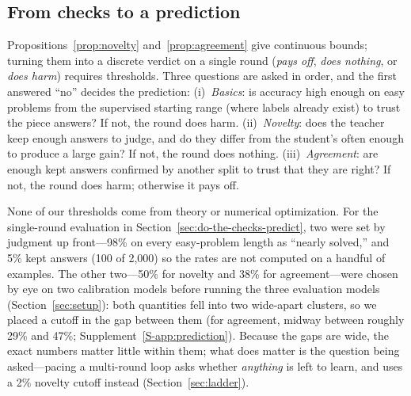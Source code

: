 \subsection{From checks to a prediction}
\label{sec:rule}

Propositions~\ref{prop:novelty} and~\ref{prop:agreement} give continuous
bounds; turning them into a discrete verdict on a single round (\emph{pays
off}, \emph{does nothing}, or \emph{does harm}) requires thresholds. Three
questions are asked in order, and the first answered ``no'' decides the
prediction: (i)~\emph{Basics}: is accuracy high enough on easy problems from
the supervised starting range (where labels already exist) to trust the piece
answers? If not, the round does harm. (ii)~\emph{Novelty}: does the teacher
keep enough answers to judge, and do they differ from the student's often
enough to produce a large gain? If not, the round does nothing.
(iii)~\emph{Agreement}: are enough kept answers confirmed by another split to
trust that they are right? If not, the round does harm; otherwise it pays off.

None of our thresholds come from theory or numerical optimization. For the
single-round evaluation in Section~\ref{sec:do-the-checks-predict}, two were set by
judgment up front---98\% on every easy-problem length as ``nearly solved,'' and
5\% kept answers (100 of 2,000) so the rates are not computed on a handful of
examples. The other two---50\% for novelty and 38\% for agreement---were chosen
by eye on two calibration models before running the three evaluation models
(Section~\ref{sec:setup}): both quantities fell into two wide-apart clusters,
so we placed a cutoff in the gap between them (for agreement, midway between
roughly 29\% and 47\%; Supplement~\ref{S-app:prediction}). Because the gaps are wide, the exact
numbers matter little within them; what does matter is the question being
asked---pacing a multi-round loop asks whether \emph{anything} is left to
learn, and uses a 2\% novelty cutoff instead (Section~\ref{sec:ladder}).
